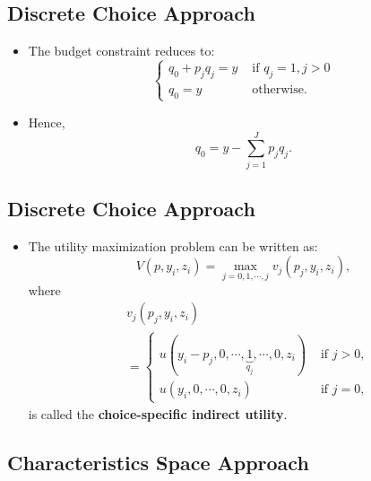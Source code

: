 \documentclass[
]{book}
\providecommand{\tightlist}{%
  \setlength{\itemsep}{0pt}\setlength{\parskip}{0pt}}
\begin{document}
\hypertarget{discrete-choice-approach-1}{%
\subsection{Discrete Choice Approach}\label{discrete-choice-approach-1}}

\begin{itemize}
\tightlist
\item
  The budget constraint reduces to:
  \begin{equation}
  \begin{cases}
  q_0 + p_j q_j = y &\text{   if   } q_j = 1, j > 0\\
  q_0 = y &\text{   otherwise}.
  \end{cases}
  \end{equation}
\item
  Hence,
  \begin{equation}
  q_0 = y - \sum_{j = 1}^J p_j q_j.
  \end{equation}
\end{itemize}

\hypertarget{discrete-choice-approach-2}{%
\subsection{Discrete Choice Approach}\label{discrete-choice-approach-2}}

\begin{itemize}
\tightlist
\item
  The utility maximization problem can be written as:
  \begin{equation}
  V(p, y_i, z_i) = \max_{j = 0, 1, \cdots, j}  v_j(p_j, y_i, z_i),
  \end{equation}
  where
  \begin{equation}
  \begin{split}
  &v_j(p_j, y_i, z_i)\\
  & =
  \begin{cases}
  u(y_i - p_j, 0, \cdots, \underbrace{1}_{q_j}, \cdots, 0, z_i) &\text{   if  }j > 0,\\
  u(y_i, 0, \cdots, 0, z_i) &\text{   if   }j = 0,
  \end{cases}
  \end{split}
  \end{equation}
  is called the \textbf{choice-specific indirect utility}.
\end{itemize}

\hypertarget{characteristics-space-approach}{%
\subsection{Characteristics Space Approach}\label{characteristics-space-approach}}
\end{document}

